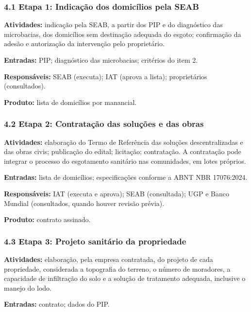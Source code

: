 \subsubsection*{4.1 Etapa 1: Indicação dos domicílios pela SEAB}

\textbf{Atividades:} indicação pela SEAB, a partir dos PIP e do diagnóstico das microbacias, dos domicílios sem destinação adequada do esgoto; confirmação da adesão e autorização da intervenção pelo proprietário.

\textbf{Entradas:} PIP; diagnóstico das microbacias; critérios do item 2.

\textbf{Responsáveis:} SEAB (executa); IAT (aprova a lista); proprietários (consultados).

\textbf{Produto:} lista de domicílios por manancial.


\subsubsection*{4.2 Etapa 2: Contratação das soluções e das obras}

\textbf{Atividades:} elaboração do Termo de Referência das soluções descentralizadas e das obras civis; publicação do edital; licitação; contratação. A contratação pode integrar o processo do esgotamento sanitário nas comunidades, em lotes próprios.

\textbf{Entradas:} lista de domicílios; especificações conforme a ABNT NBR 17076:2024.

\textbf{Responsáveis:} IAT (executa e aprova); SEAB (consultada); UGP e Banco Mundial (consultados, quando houver revisão prévia).

\textbf{Produto:} contrato assinado.

\subsubsection*{4.3 Etapa 3: Projeto sanitário da propriedade}

\textbf{Atividades:} elaboração, pela empresa contratada, do projeto de cada propriedade, considerada a topografia do terreno, o número de moradores, a capacidade de infiltração do solo e a solução de tratamento adequada, inclusive o manejo do lodo.

\textbf{Entradas:} contrato; dados do PIP.

